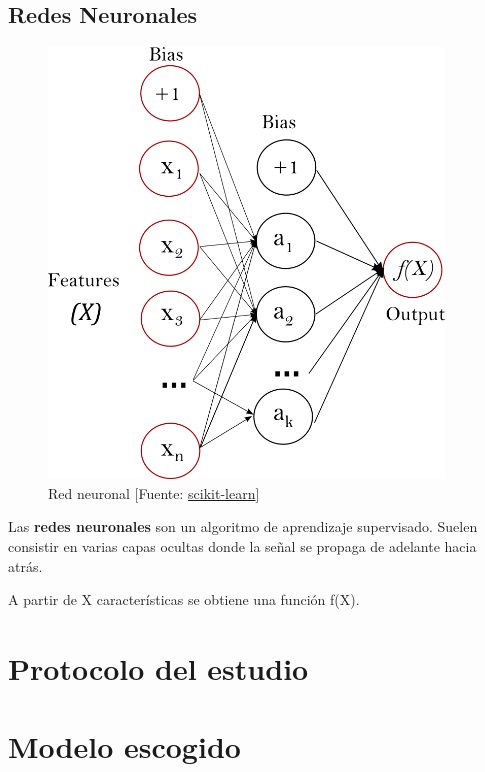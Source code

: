 	\subsection{Redes Neuronales}
	\label{makereference4.3.3}
	
	\begin{figure}[htb]
		
		\begin{center}
			\includegraphics[height=4.5in]{figures/neuronal_network.png}
			\caption{Red neuronal [Fuente: \href{www.scikit-learn.org}{scikit-learn}]}
		\end{center}
		
		\label{network}
	\end{figure}

	Las \textbf{redes neuronales} son un algoritmo de aprendizaje supervisado. Suelen consistir en varias capas ocultas donde la señal se propaga de adelante hacia atrás.
	
	A partir de X características se obtiene una función f(X).
	
\section{Protocolo del estudio}
\label{makereference4.4}

\section{Modelo escogido}
\label{makereference4.5}
